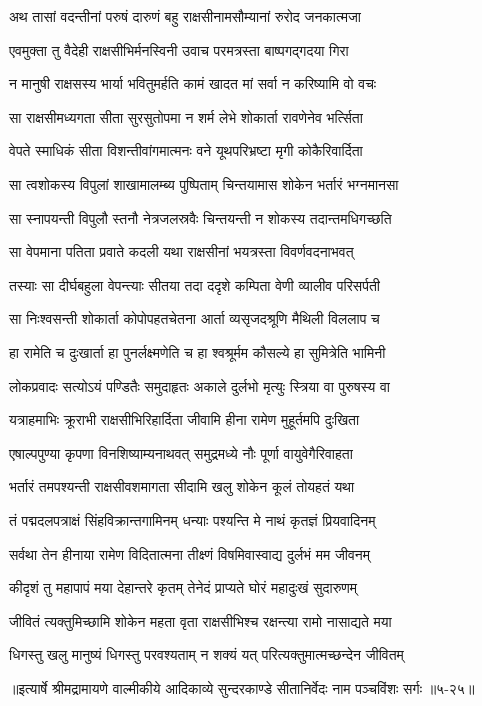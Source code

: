 
\twolineshloka
{अथ तासां वदन्तीनां परुषं दारुणं बहु}
{राक्षसीनामसौम्यानां रुरोद जनकात्मजा} %

\twolineshloka
{एवमुक्ता तु वैदेही राक्षसीभिर्मनस्विनी}
{उवाच परमत्रस्ता बाष्पगद्गदया गिरा} %

\twolineshloka
{न मानुषी राक्षसस्य भार्या भवितुमर्हति}
{कामं खादत मां सर्वा न करिष्यामि वो वचः} %

\twolineshloka
{सा राक्षसीमध्यगता सीता सुरसुतोपमा}
{न शर्म लेभे शोकार्ता रावणेनेव भर्त्सिता} %

\twolineshloka
{वेपते स्माधिकं सीता विशन्तीवांगमात्मनः}
{वने यूथपरिभ्रष्टा मृगी कोकैरिवार्दिता} %

\twolineshloka
{सा त्वशोकस्य विपुलां शाखामालम्ब्य पुष्पिताम्}
{चिन्तयामास शोकेन भर्तारं भग्नमानसा} %

\twolineshloka
{सा स्नापयन्ती विपुलौ स्तनौ नेत्रजलस्रवैः}
{चिन्तयन्ती न शोकस्य तदान्तमधिगच्छति} %

\twolineshloka
{सा वेपमाना पतिता प्रवाते कदली यथा}
{राक्षसीनां भयत्रस्ता विवर्णवदनाभवत्} %

\twolineshloka
{तस्याः सा दीर्घबहुला वेपन्त्याः सीतया तदा}
{ददृशे कम्पिता वेणी व्यालीव परिसर्पती} %

\twolineshloka
{सा निःश्वसन्ती शोकार्ता कोपोपहतचेतना}
{आर्ता व्यसृजदश्रूणि मैथिली विललाप च} %

\twolineshloka
{हा रामेति च दुःखार्ता हा पुनर्लक्ष्मणेति च}
{हा श्वश्रूर्मम कौसल्ये हा सुमित्रेति भामिनी} %

\twolineshloka
{लोकप्रवादः सत्योऽयं पण्डितैः समुदाहृतः}
{अकाले दुर्लभो मृत्युः स्त्रिया वा पुरुषस्य वा} %

\twolineshloka
{यत्राहमाभिः क्रूराभी राक्षसीभिरिहार्दिता}
{जीवामि हीना रामेण मुहूर्तमपि दुःखिता} %

\twolineshloka
{एषाल्पपुण्या कृपणा विनशिष्याम्यनाथवत्}
{समुद्रमध्ये नौः पूर्णा वायुवेगैरिवाहता} %

\twolineshloka
{भर्तारं तमपश्यन्ती राक्षसीवशमागता}
{सीदामि खलु शोकेन कूलं तोयहतं यथा} %

\twolineshloka
{तं पद्मदलपत्राक्षं सिंहविक्रान्तगामिनम्}
{धन्याः पश्यन्ति मे नाथं कृतज्ञं प्रियवादिनम्} %

\twolineshloka
{सर्वथा तेन हीनाया रामेण विदितात्मना}
{तीक्ष्णं विषमिवास्वाद्य दुर्लभं मम जीवनम्} %

\twolineshloka
{कीदृशं तु महापापं मया देहान्तरे कृतम्}
{तेनेदं प्राप्यते घोरं महादुःखं सुदारुणम्} %

\twolineshloka
{जीवितं त्यक्तुमिच्छामि शोकेन महता वृता}
{राक्षसीभिश्च रक्षन्त्या रामो नासाद्यते मया} %

\twolineshloka
{धिगस्तु खलु मानुष्यं धिगस्तु परवश्यताम्}
{न शक्यं यत् परित्यक्तुमात्मच्छन्देन जीवितम्} %


॥इत्यार्षे श्रीमद्रामायणे वाल्मीकीये आदिकाव्ये सुन्दरकाण्डे सीतानिर्वेदः नाम पञ्चविंशः सर्गः ॥५-२५॥
